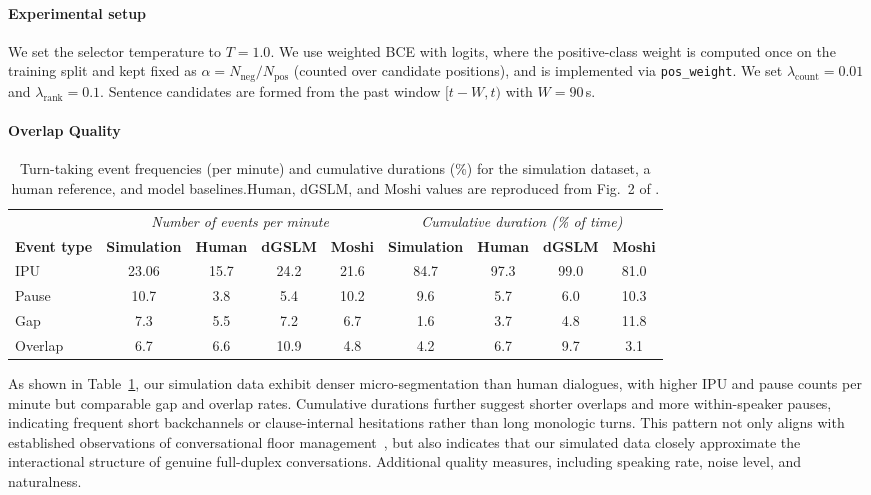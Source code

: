 \paragraph{Experimental setup}
We set the selector temperature to $T=1.0$. We use weighted BCE with logits, where the positive-class weight is computed once on the training split and kept fixed as $\alpha = N_{\text{neg}}/N_{\text{pos}}$ (counted over candidate positions), and is implemented via \texttt{pos\_weight}. We set $\lambda_{\text{count}}=0.01$ and $\lambda_{\text{rank}}=0.1$. Sentence candidates are formed from the past window $[t-W,t)$ with $W=90$\,s.



\paragraph{Overlap Quality}
\begin{table}[t]
\centering
\scriptsize
\caption{Turn-taking event frequencies (per minute) and cumulative durations (\%) for the simulation dataset, a human reference, and model baselines.Human, dGSLM, and Moshi values are reproduced from Fig.~2 of \citep{arxiv:2503.01174}.}
\label{tab:quality-check1}

\begin{tabular}{lcccccccc}
\toprule
& \multicolumn{4}{c}{\textit{Number of events per minute}} & \multicolumn{4}{c}{\textit{Cumulative duration (\% of time)}} \\
\textbf{Event type} & \textbf{Simulation} & \textbf{Human} & \textbf{dGSLM} & \textbf{Moshi} & \textbf{Simulation} & \textbf{Human} & \textbf{dGSLM} & \textbf{Moshi} \\
\midrule
IPU       & 23.06 & 15.7  & 24.2  & 21.6  & 84.7 & 97.3 & 99.0 & 81.0 \\
Pause     & 10.7  & 3.8   & 5.4   & 10.2  & 9.6  & 5.7  & 6.0  & 10.3 \\
Gap       & 7.3   & 5.5   & 7.2   & 6.7   & 1.6  & 3.7  & 4.8  & 11.8 \\
Overlap   & 6.7   & 6.6   & 10.9  & 4.8   & 4.2  & 6.7  & 9.7  & 3.1 \\
\bottomrule
\end{tabular}
\end{table}

As shown in Table~\ref{tab:quality-check1}, our simulation data exhibit denser micro-segmentation than human dialogues, with higher IPU and pause counts per minute but comparable gap and overlap rates. Cumulative durations further suggest shorter overlaps and more within-speaker pauses, indicating frequent short backchannels or clause-internal hesitations rather than long monologic turns. This pattern not only aligns with established observations of conversational floor management~\citep{sacks1974simplest, stivers2009universals}, but also indicates that our simulated data closely approximate the interactional structure of genuine full-duplex conversations. Additional quality measures, including speaking rate, noise level, and naturalness.

